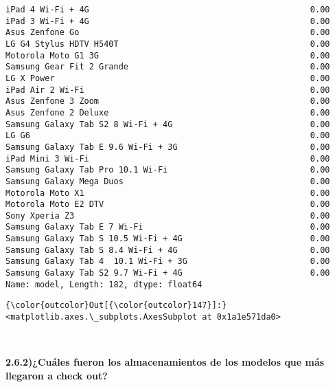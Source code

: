 \documentclass[11pt]{article}
\begin{document}
\begin{Verbatim}[commandchars=\\\{\}]
iPad 4 Wi-Fi + 4G                                             0.00
iPad 3 Wi-Fi + 4G                                             0.00
Asus Zenfone Go                                               0.00
LG G4 Stylus HDTV H540T                                       0.00
Motorola Moto G1 3G                                           0.00
Samsung Gear Fit 2 Grande                                     0.00
LG X Power                                                    0.00
iPad Air 2 Wi-Fi                                              0.00
Asus Zenfone 3 Zoom                                           0.00
Asus Zenfone 2 Deluxe                                         0.00
Samsung Galaxy Tab S2 8 Wi-Fi + 4G                            0.00
LG G6                                                         0.00
Samsung Galaxy Tab E 9.6 Wi-Fi + 3G                           0.00
iPad Mini 3 Wi-Fi                                             0.00
Samsung Galaxy Tab Pro 10.1 Wi-Fi                             0.00
Samsung Galaxy Mega Duos                                      0.00
Motorola Moto X1                                              0.00
Motorola Moto E2 DTV                                          0.00
Sony Xperia Z3                                                0.00
Samsung Galaxy Tab E 7 Wi-Fi                                  0.00
Samsung Galaxy Tab S 10.5 Wi-Fi + 4G                          0.00
Samsung Galaxy Tab S 8.4 Wi-Fi + 4G                           0.00
Samsung Galaxy Tab 4  10.1 Wi-Fi + 3G                         0.00
Samsung Galaxy Tab S2 9.7 Wi-Fi + 4G                          0.00
Name: model, Length: 182, dtype: float64

    \end{Verbatim}

\begin{Verbatim}[commandchars=\\\{\}]
{\color{outcolor}Out[{\color{outcolor}147}]:} <matplotlib.axes.\_subplots.AxesSubplot at 0x1a1e571da0>
\end{Verbatim}
            
    \begin{center}
    \end{center}
    { \hspace*{\fill} \\}
    
    \textbf{2.6.2)¿Cuáles fueron los almacenamientos de los modelos que más
llegaron a check out?}
\end{document}
